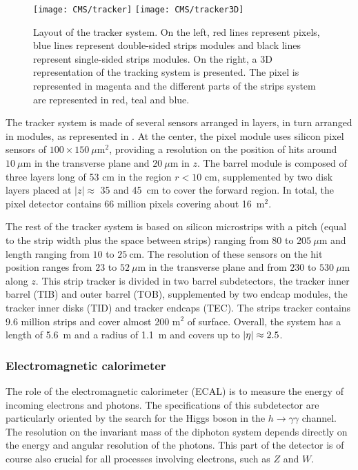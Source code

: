     \begin{figure}[h!]
        \centering
        \texttt{[image: CMS/tracker]}
        \texttt{[image: CMS/tracker3D]}
        \caption{Layout of the tracker system.  On the left, red lines represent
        pixels, blue lines represent double-sided strips modules and black lines
        represent single-sided strips modules. On the right, a 3D representation
        of the tracking system is presented. The pixel is represented in magenta
        and the different parts of the strips system are represented in red,
        teal and blue.}
        \label{fig:CMS/tracker}
    \end{figure}

    The tracker system is made of several sensors arranged in layers, in turn
    arranged in modules, as represented in . At the
    center, the pixel module uses silicon pixel sensors of $100 \times
    150~\mu\text{m}^2$, providing a resolution on the position of hits around
    $10~\mu\text{m}$ in the transverse plane and $20~\mu\text{m}$ in $z$. The
    barrel module is composed of three layers long of 53 cm in the region $r <
    10$ cm, supplemented by two disk layers placed at $\left|z\right| \approx$
    35 and 45~cm to cover the forward region. In total, the pixel detector
    contains 66 million pixels covering about 16~m$^2$.

    The rest of the tracker system is based on silicon microstrips with a pitch
    (equal to the strip width plus the space between strips) ranging from $80$
    to $205~\mu\text{m}$ and length ranging from $10$ to $25~\text{cm}$.  The
    resolution of these sensors on the hit position ranges from $23$ to
    $52~\mu\text{m}$ in the transverse plane and from $230$ to $530~\mu\text{m}$
    along $z$.  This strip tracker is divided in two barrel subdetectors, the
    tracker inner barrel (TIB) and outer barrel (TOB), supplemented by two
    endcap modules, the tracker inner disks (TID) and tracker endcaps (TEC). The
    strips tracker contains 9.6 million strips and cover almost 200 m$^2$ of
    surface. Overall, the system has a length of 5.6~m and a radius of 1.1~m and
    covers up to $\left| \eta \right| \approx 2.5$.

        \subsubsection{Electromagnetic calorimeter}

    The role of the electromagnetic calorimeter (ECAL) is to measure the energy
    of incoming electrons and photons. The specifications of this subdetector
    are particularly oriented by the search for the Higgs boson in the $h
    \rightarrow \gamma \gamma$ channel. The resolution on the invariant mass of
    the diphoton system depends directly on the energy and angular resolution of
    the photons. This part of the detector is of course also crucial for all
    processes involving electrons, such as $Z$ and $W$.

